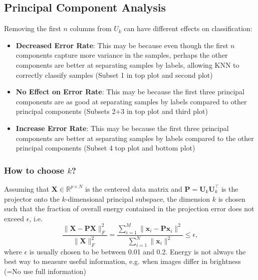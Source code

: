 \documentclass[english]{latex4ei/latex4ei_sheet}
\begin{document}
\begin{sectionbox}
\subsection{Principal Component Analysis}
Removing the first $n$ columns from $U_k$ can have different effects on classification:
\begin{itemize}
    \item \textbf{Decreased Error Rate}: This may be because even though the first $n$ components capture more variance in the samples, perhaps the other components are better at separating samples by labels, allowing KNN to correctly classify samples (Subset 1 in top plot and second plot)
    \item \textbf{No Effect on Error Rate}: This may be because the first three principal components are as good at separating samples by labels compared to other principal components (Subsets 2+3 in top plot and third plot)
    \item \textbf{Increase Error Rate}: This may be because the first three principal components are better at separating samples by labels compared to the other principal components (Subset 4 top plot and bottom plot)
\end{itemize}
\subsubsection{How to choose $k$?}
Assuming that $\mathbf{X} \in \mathbb{R}^{p \times N}$ is the centered data matrix and $\mathbf{P} = \mathbf{U}_k \mathbf{U}_k^\top$ is the projector onto the $k$-dimensional principal subspace, the dimension $k$ is chosen such that the fraction of overall energy contained in the projection error does not exceed $\epsilon$, i.e.\
	\begin{equation*}
	    \frac{\|\mathbf{X} - \mathbf{PX}\|_F^2}{\|\mathbf{X}\|_F^2} 
	    = \frac{\sum_{i=1}^{M} \|\mathbf{x}_i - \mathbf{Px}_i\|^2}{\sum_{i=1}^N \|\mathbf{x}_i\|^2} \leq \epsilon,
	\end{equation*}
where $\epsilon$ is usually chosen to be between 0.01 and 0.2. Energy is not always the best way to measure useful information, e.g. when images differ in brightness (=No use full information)
\end{sectionbox}
\end{document}
